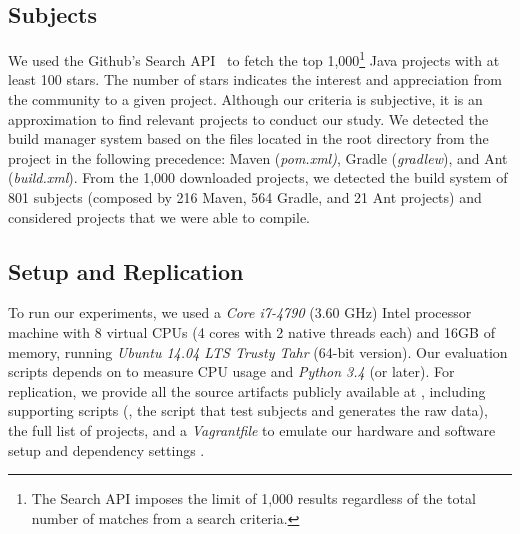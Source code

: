 \subsection{Subjects}
\label{sec:subjects}

We used the Github's
Search API~\cite{githubsearch} to fetch the top 1,000\footnote{The
    Search API imposes the limit of 1,000 results regardless of the
total number of matches from a search criteria.} Java projects with at
least 100 stars. The number of stars indicates the interest and
appreciation from the community to a given project.
 Although our
criteria is subjective, it is an approximation to find relevant
projects to conduct our study. We detected the build manager system
based on the files located in the root directory from the project in
the following precedence: Maven (\emph{pom.xml)}, Gradle
(\emph{gradlew}), and Ant (\emph{build.xml}).
From the 1,000 downloaded projects, we detected the build system of
801 subjects (composed by 216 Maven, 564 Gradle, and 21 Ant projects)
and considered  projects that we were able to compile.

\subsection{Setup and Replication}
\label{sec:setup}

To run our experiments, we used a \emph{Core i7-4790} (3.60 GHz) Intel
processor machine with 8 virtual CPUs (4 cores with 2 native threads
each) and 16GB of memory, running \emph{Ubuntu 14.04 LTS Trusty Tahr}
(64-bit version). Our evaluation scripts depends on  to measure CPU usage and \emph{Python 3.4} (or
later). For replication, we provide all the source artifacts publicly
available at , including supporting scripts (\eg,
the script that test subjects and generates the raw data), the full
list of projects, and a \emph{Vagrantfile} to emulate our hardware and
software setup and dependency settings .

